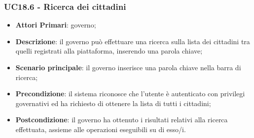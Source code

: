 \subsubsection{UC18.6 - Ricerca dei cittadini}
\begin{itemize}
	\item \textbf{Attori Primari}: governo;
	\item \textbf{Descrizione}:
	il governo può effettuare una ricerca sulla lista dei cittadini tra quelli registrati alla piattaforma, inserendo una parola chiave;
	\item \textbf{Scenario principale}: il governo inserisce una parola chiave nella barra di ricerca;
	\item \textbf{Precondizione}: il sistema riconosce che l'utente è autenticato con privilegi governativi ed ha richiesto di ottenere la lista di tutti i cittadini;
	\item \textbf{Postcondizione}:
	 il governo ha ottenuto i risultati relativi alla ricerca effettuata, assieme alle operazioni eseguibili su di esso/i.
\end{itemize}


